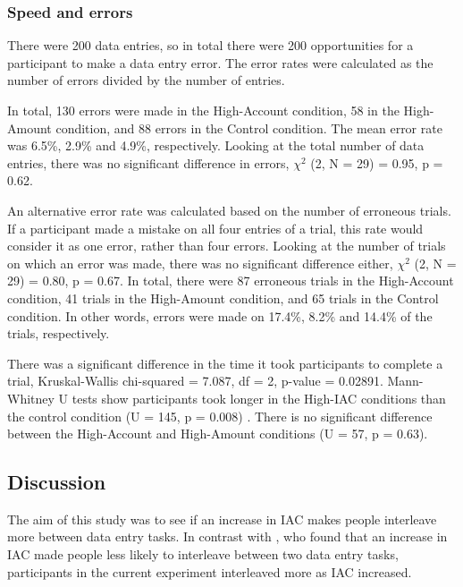\begin{table}
\begin{enumerate}
\subsubsection{Speed and errors}
There were 200 data entries, so in total there were 200 opportunities for a participant to make a data entry error. The error rates were calculated as the number of errors divided by the number of entries. 

In total, 130 errors were made in the High-Account condition, 58 in the High-Amount condition, and 88 errors in the Control condition. The mean error rate was 6.5\%, 2.9\% and 4.9\%, respectively. 
Looking at the total number of data entries, there was no significant difference in errors, $\chi^2$ (2, N = 29) =  0.95, p = 0.62.

An alternative error rate was calculated based on the number of erroneous trials. If a participant made a mistake on all four entries of a trial, this rate would consider it as one error, rather than four errors. Looking at the number of trials on which an error was made, there was no significant difference either, $\chi^2$ (2, N = 29) =  0.80, p = 0.67. In total, there were 87 erroneous trials in the High-Account condition, 41 trials in the High-Amount condition, and 65 trials in the Control condition. In other words, errors were made on 17.4\%, 8.2\% and 14.4\% of the trials, respectively. 

There was a significant difference in the time it took participants to complete a trial, Kruskal-Wallis chi-squared = 7.087, df = 2, p-value = 0.02891. Mann-Whitney U tests show participants took longer in the High-IAC conditions than the control condition  (U = 145, p = 0.008) . There is no significant difference between the High-Account and High-Amount conditions (U = 57, p = 0.63).

\subsection{Discussion}
The aim of this study was to see if an increase in IAC makes people interleave more between data entry tasks. In contrast with \citet{Back2012}, who found that an increase in IAC made people less likely to interleave between two data entry tasks, participants in the current experiment interleaved more as IAC increased.


\end{enumerate}
\end{table}
